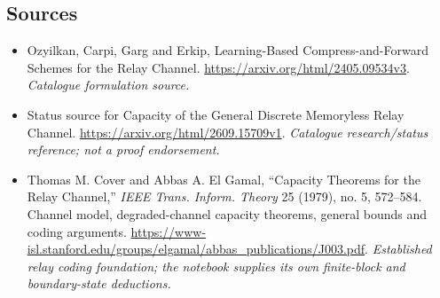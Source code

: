 \documentclass[11pt,a4paper]{article}
\numberwithin{equation}{section}
\begin{document}
\subsection{Sources}
\begin{itemize}\raggedright
\item[\textnormal{[S1]}]\hypertarget{source:167:1}{} Ozyilkan, Carpi, Garg and Erkip, Learning-Based Compress-and-Forward Schemes for the Relay Channel.
\url{https://arxiv.org/html/2405.09534v3}.
{\small\textit{Catalogue formulation source.}}
\item[\textnormal{[S2]}]\hypertarget{source:167:2}{} Status source for Capacity of the General Discrete Memoryless Relay Channel.
\url{https://arxiv.org/html/2609.15709v1}.
{\small\textit{Catalogue research/status reference; not a proof endorsement.}}
\item[\textnormal{[E1]}]\hypertarget{extra:167:1}{} Thomas M. Cover and Abbas A. El Gamal, ``Capacity Theorems for the Relay Channel,'' \emph{IEEE Trans. Inform. Theory} 25 (1979), no. 5, 572--584. Channel model, degraded-channel capacity theorems, general bounds and coding arguments.
\url{https://www-isl.stanford.edu/groups/elgamal/abbas_publications/J003.pdf}.
{\small\textit{Established relay coding foundation; the notebook supplies its own finite-block and boundary-state deductions.}}
\end{itemize}
\end{document}
